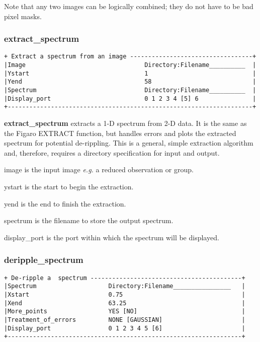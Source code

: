 {Note that any two images can be logically combined; they do not have to
be bad pixel masks.

\subsubsection{extract\_spectrum}
\begin{verbatim}
+ Extract a spectrum from an image ----------------------------------+
|Image                                 Directory:Filename__________  |
|Ystart                                1                             |
|Yend                                  58                            |
|Spectrum                              Directory:Filename__________  |
|Display_port                          0 1 2 3 4 [5] 6               |
+--------------------------------------------------------------------+
\end{verbatim}

{\bf extract\_spectrum} extracts a 1-D spectrum from 2-D data. It is the 
same as the Figaro EXTRACT function, but handles errors and plots the
extracted spectrum for potential de-rippling. This is a general, simple
extraction algorithm and, therefore, requires a directory specification 
for input and output.

{\sf image} is the input image {\em e.g.} a reduced observation or group.

{\sf ystart} is the start to begin the extraction.

{\sf yend} is the end  to finish the extraction.

{\sf spectrum} is the filename to store the output spectrum.

{\sf display\_port} is the port within which the spectrum will be displayed.

\subsubsection{deripple\_spectrum}
\label{deripple_spectrum}
\begin{verbatim}
+ De-ripple a  spectrum ------------------------------------------+
|Spectrum                    Directory:Filename________________   |
|Xstart                      0.75                                 |
|Xend                        63.25                                |
|More_points                 YES [NO]                             |
|Treatment_of_errors         NONE [GAUSSIAN]                      |
|Display_port                0 1 2 3 4 5 [6]                      |
+-----------------------------------------------------------------+
\end{verbatim}

}
